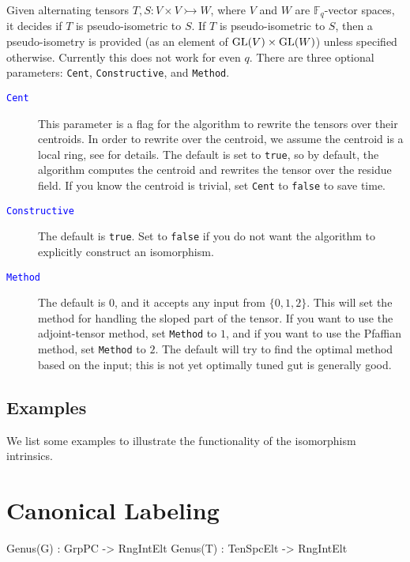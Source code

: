 \documentclass{documentation}
\DeclareMathOperator{\GL}{{\rm GL}}
\begin{document}
\color{black}
Given alternating tensors $T, S : V\times V \rightarrowtail W$, where $V$ and $W$ are $\mathbb{F}_q$-vector spaces, it decides if $T$ is pseudo-isometric to $S$.
If $T$ is pseudo-isometric to $S$, then a pseudo-isometry is provided (as an element of $\GL(V)\times \GL(W)$) unless specified otherwise. 
Currently this does not work for even $q$. 
There are three optional parameters: {\tt Cent}, {\tt Constructive}, and {\tt Method}.

\begin{description}
\item[\textcolor{blue}{\tt Cent}]
This parameter is a flag for the algorithm to rewrite the tensors over their centroids. 
In order to rewrite over the centroid, we assume the centroid is a local ring, see \cite{TensorSpacePackage} for details.
The default is set to {\tt true}, so by default, the algorithm computes the centroid and rewrites the tensor over the residue field.
If you know the centroid is trivial, set {\tt Cent} to {\tt false} to save time.
\item[\textcolor{blue}{\tt Constructive}]
The default is {\tt true}. 
Set to {\tt false} if you do not want the algorithm to explicitly construct an isomorphism.
\item[\textcolor{blue}{\tt Method}]
The default is $0$, and it accepts any input from $\{ 0,1,2\}$. 
This will set the method for handling the sloped part of the tensor.
If you want to use the adjoint-tensor method, set {\tt Method} to $1$, and if you want to use the Pfaffian method, set {\tt Method} to $2$. The default will try to find the optimal method based on the input; this is not yet optimally tuned gut is generally good.
\end{description}


\section{Examples}
We list some examples to illustrate the functionality of the isomorphism intrinsics.


\chapter{Canonical Labeling}

\begin{intrinsics}
Genus(G) : GrpPC -> RngIntElt
Genus(T) : TenSpcElt -> RngIntElt
\end{intrinsics}
\end{document}
